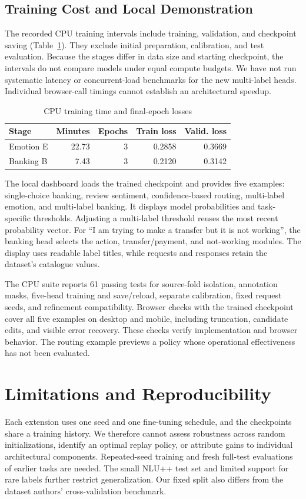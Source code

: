 \documentclass[conference]{IEEEtran}
\begin{document}
\subsection{Training Cost and Local Demonstration}
The recorded CPU training intervals include training, validation, and checkpoint saving (Table~\ref{tab:training}). They exclude initial preparation, calibration, and test evaluation. Because the stages differ in data size and starting checkpoint, the intervals do not compare models under equal compute budgets. We have not run systematic latency or concurrent-load benchmarks for the new multi-label heads. Individual browser-call timings cannot establish an architectural speedup.

\begin{table}[!t]
\caption{CPU training time and final-epoch losses}
\label{tab:training}
\centering\footnotesize\setlength{\tabcolsep}{3.5pt}
\begin{tabular}{lrrrr}\toprule
Stage & Minutes & Epochs & Train loss & Valid. loss\\\midrule
Emotion E & 22.73 & 3 & 0.2858 & 0.3669\\
Banking B & 7.43 & 3 & 0.2120 & 0.3142\\
\bottomrule\end{tabular}
\end{table}

The local dashboard loads the trained checkpoint and provides five examples: single-choice banking, review sentiment, confidence-based routing, multi-label emotion, and multi-label banking. It displays model probabilities and task-specific thresholds. Adjusting a multi-label threshold reuses the most recent probability vector. For ``I am trying to make a transfer but it is not working'', the banking head selects the action, transfer/payment, and not-working modules. The display uses readable label titles, while requests and responses retain the dataset's catalogue values.

The CPU suite reports 61 passing tests for source-fold isolation, annotation masks, five-head training and save/reload, separate calibration, fixed request seeds, and refinement compatibility. Browser checks with the trained checkpoint cover all five examples on desktop and mobile, including truncation, candidate edits, and visible error recovery. These checks verify implementation and browser behavior. The routing example previews a policy whose operational effectiveness has not been evaluated.

\section{Limitations and Reproducibility}
Each extension uses one seed and one fine-tuning schedule, and the checkpoints share a training history. We therefore cannot assess robustness across random initializations, identify an optimal replay policy, or attribute gains to individual architectural components. Repeated-seed training and fresh full-test evaluations of earlier tasks are needed. The small NLU++ test set and limited support for rare labels further restrict generalization. Our fixed split also differs from the dataset authors' cross-validation benchmark.
\end{document}
